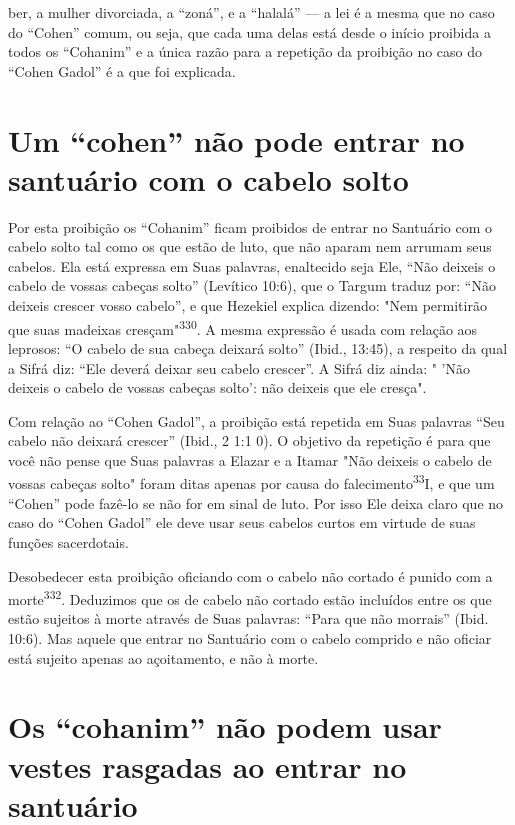 ber, a mulher divorciada, a ``zoná'', e a ``halalá'' --- a lei é a mesma que
no caso do ``Cohen'' comum, ou seja, que cada uma delas está desde o
início proibida a todos os ``Cohanim'' e a única razão para a repetição da
proibição no caso do ``Cohen Gadol'' é a que foi explicada.

\section{Um ``cohen'' não pode entrar no santuário com o cabelo solto}

Por esta proibição os ``Cohanim'' ficam proibidos de entrar no San­tuário
com o cabelo solto tal como os que estão de luto, que não aparam nem
arrumam seus cabelos. Ela está expressa em Suas palavras, enaltecido
seja Ele, ``Não deixeis o cabelo de vossas cabeças solto'' (Levítico
10:6), que o Targum traduz por: ``Não deixeis crescer vosso cabelo'', e
que Hezekiel explica dizen­do: "Nem permitirão que suas madeixas
cresçam"\textsuperscript{330}. A mesma expressão é usada com relação aos
leprosos: ``O cabelo de sua cabeça deixará solto'' (Ibid., 13:45), a
respeito da qual a Sifrá diz: ``Ele deverá deixar seu cabelo crescer''. A
Sifrá diz ainda: " 'Não deixeis o cabelo de vossas cabeças solto': não
deixeis que ele cresça".

Com relação ao ``Cohen Gadol'', a proibição está repetida em Suas palavras
``Seu cabelo não deixará crescer'' (Ibid., 2 1:1 0). O objetivo da
repeti­ção é para que você não pense que Suas palavras a Elazar e a
Itamar "Não dei­xeis o cabelo de vossas cabeças solto" foram ditas
apenas por causa do falecimento\textsuperscript{33}I, e que um ``Cohen''
pode fazê-lo se não for em sinal de luto. Por isso Ele deixa claro que
no caso do ``Cohen Gadol'' ele deve usar seus ca­belos curtos em virtude
de suas funções sacerdotais.

Desobedecer esta proibição oficiando com o cabelo não cortado é punido
com a morte\textsuperscript{332}. Deduzimos que os de cabelo não cortado
estão incluí­dos entre os que estão sujeitos à morte através de Suas
palavras: ``Para que não morrais'' (Ibid. 10:6). Mas aquele que entrar no
Santuário com o cabelo com­prido e não oficiar está sujeito apenas ao
açoitamento, e não à morte.

\section{Os ``cohanim'' não podem usar vestes rasgadas ao entrar no santuário}

